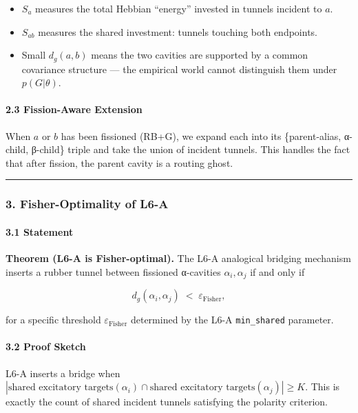 \documentclass[
  11pt,
  a4paper,
]{article}
\providecommand{\tightlist}{%
  \setlength{\itemsep}{0pt}\setlength{\parskip}{0pt}}
\begin{document}
\begin{itemize}
\tightlist
\item
  \(S_a\) measures the total Hebbian ``energy'' invested in tunnels
  incident to \(a\).
\item
  \(S_{ab}\) measures the shared investment: tunnels touching both
  endpoints.
\item
  Small \(d_g(a, b)\) means the two cavities are supported by a common
  covariance structure --- the empirical world cannot distinguish them
  under \(p(G|\theta)\).
\end{itemize}

\paragraph{2.3 Fission-Aware Extension}\label{fission-aware-extension}

When \(a\) or \(b\) has been fissioned (RB+G), we expand each into its
\{parent-alias, α-child, β-child\} triple and take the union of incident
tunnels. This handles the fact that after fission, the parent cavity is
a routing ghost.

\begin{center}\rule{0.5\linewidth}{0.5pt}\end{center}

\subsubsection{3. Fisher-Optimality of
L6-A}\label{fisher-optimality-of-l6-a}

\paragraph{3.1 Statement}\label{statement}

\textbf{Theorem (L6-A is Fisher-optimal).} The L6-A analogical bridging
mechanism inserts a rubber tunnel between fissioned α-cavities
\(\alpha_i, \alpha_j\) if and only if

\[
d_g(\alpha_i, \alpha_j) \;<\; \varepsilon_\text{Fisher},
\]

for a specific threshold \(\varepsilon_\text{Fisher}\) determined by the
L6-A \texttt{min\_shared} parameter.

\paragraph{3.2 Proof Sketch}\label{proof-sketch}

L6-A inserts a bridge when
\(|\text{shared excitatory targets}(\alpha_i) \cap \text{shared excitatory targets}(\alpha_j)| \geq K\).
This is exactly the count of shared incident tunnels satisfying the
polarity criterion.
\end{document}
